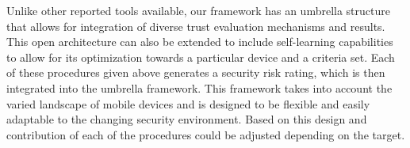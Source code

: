 Unlike other reported tools available, our framework has an umbrella structure that allows for integration of 
diverse trust evaluation mechanisms and results. This open architecture can also be extended to include 
 self-learning capabilities to allow for its optimization towards a particular device and a criteria set. Each of these procedures given above generates a security risk rating, which is then integrated into the umbrella framework. This framework takes into account the varied landscape of mobile devices and is designed to be flexible and easily adaptable to the changing security environment. Based on this design and contribution of each of the procedures could be adjusted depending on the target.
